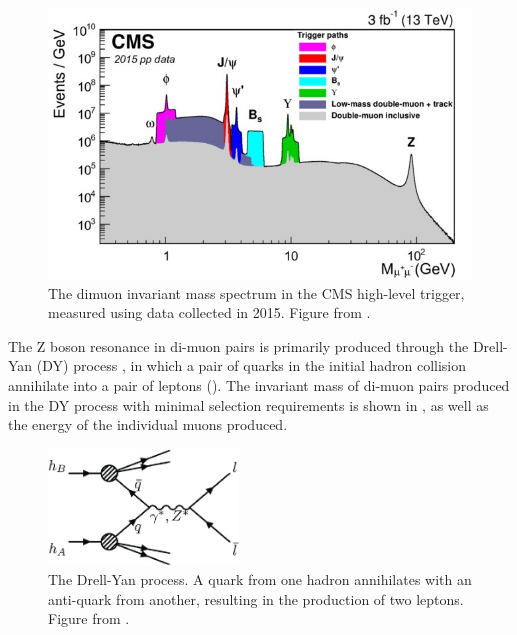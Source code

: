 \begin{figure}[ht]
	\centering
	\includegraphics[width=\textwidth]{figures/cms_diMuonSpectrum.jpg}
	\caption[Inclusive dimuon spectrum in CMS]{The dimuon invariant mass spectrum in the CMS high-level trigger, measured using data collected in 2015. Figure from \cite{cmsMuonPerformance}.}
	\label{fig:diMuonSpectrum}
\end{figure}

The Z boson resonance in di-muon pairs is primarily produced through the Drell-Yan (DY) process \cite{origDYPaper,DYSummary}, in which a pair of quarks in the initial hadron collision annihilate into a pair of leptons ().
The invariant mass of di-muon pairs produced in the DY process with minimal selection requirements is shown in , as well as the energy of the individual muons produced. 

\begin{figure}[ht]
	\centering
	\includegraphics[width=0.45\textwidth]{figures/dyProcess.pdf}
	\caption[Feynman Diagram for the DY Process]{The Drell-Yan process. A quark from one hadron annihilates with an anti-quark from another, resulting in the production of two leptons. Figure from \cite{bechtel2023}.}
	\label{fig:dyDiagram}
\end{figure}

